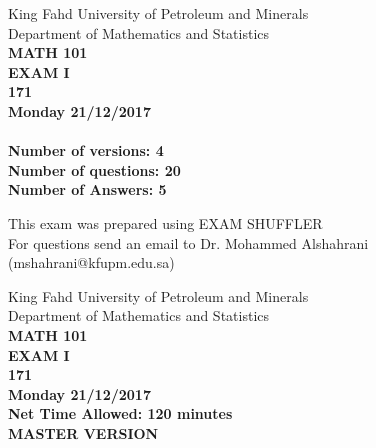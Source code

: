 \documentclass[amsfonts,bezier,leqno,fleqn,12pt,a4paper]{article}
\begin{document}
    
\thispagestyle{empty}

\begin{center}
    \begin{large}
        King Fahd University of Petroleum and Minerals\\ %
        Department of Mathematics and Statistics\\ %
        \vspace*{2cm}
        {\bf MATH 101}  \\
        {\bf EXAM I}  \\
        {\bf 171}  \\
        {\bf Monday 21/12/2017 }  \\ %

        \vspace*{3cm}
        {\bf{\Huge{}}}\\
        \vspace*{2cm}
        {\bf Number of versions: 4 }  \\
        {\bf Number of questions: 20 }  \\
        {\bf Number of Answers: 5}  \\
    \end{large}
    \vfill

    \tiny{This exam was prepared using EXAM SHUFFLER\\}
    \tiny{For questions send an email to Dr. Mohammed Alshahrani (mshahrani@kfupm.edu.sa)\\}

\end{center}

\newpage
\thispagestyle{empty}

\begin{center}
    \begin{large}
        King Fahd University of Petroleum and Minerals\\ %
        Department of Mathematics and Statistics\\ %
        {\bf MATH 101}  \\
        {\bf EXAM I}  \\
        {\bf 171}  \\
        {\bf Monday 21/12/2017 }  \\ %
        {\bf Net Time Allowed: 120 minutes}  \\
        \vspace*{6cm}
        {\bf {\Huge{MASTER VERSION}}}  \\
    \end{large}
\end{center}
\end{document}

